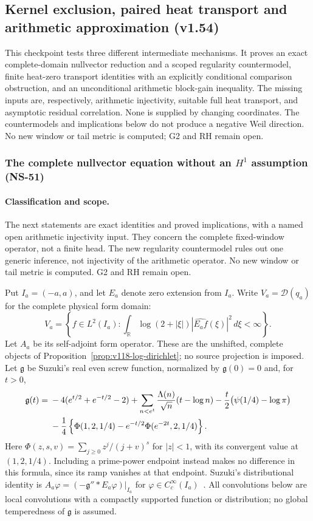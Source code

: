 \documentclass[11pt]{article}
\theoremstyle{remark}
\begin{document}
\subsection{Kernel exclusion, paired heat transport and arithmetic approximation (v1.54)}
\label{sec:v154-new-shapes}
This checkpoint tests three different intermediate mechanisms. It proves an
exact complete-domain nullvector reduction and a scoped regularity countermodel,
finite heat-zero transport identities with an explicitly conditional comparison
obstruction, and an unconditional arithmetic block-gain inequality. The missing
inputs are, respectively, arithmetic injectivity, suitable full heat transport,
and asymptotic residual correlation. None is supplied by changing coordinates.
The countermodels and implications below do not produce a negative Weil
direction. No new window or tail metric is computed; G2 and RH remain open.

\subsubsection{The complete nullvector equation without an \texorpdfstring{$H^1$}{H1} assumption (NS-51)}

\paragraph{Classification and scope.}
The next statements are exact identities and proved implications, with a
named open arithmetic injectivity input. They concern the complete
fixed-window operator, not a finite head. The new regularity countermodel
rules out one generic inference, not injectivity of the arithmetic
operator. No new window or tail metric is computed. G2 and RH remain open.

Put $I_a=(-a,a)$, and let $E_a$ denote zero extension from $I_a$.
Write $V_a=\mathcal D(q_a)$ for the complete physical form domain:
\[
 V_a=\left\{f\in L^2(I_a):
  \int_{\mathbb R}\log(2+|\xi|)|\widehat{E_af}(\xi)|^2\,d\xi<\infty\right\}.
\]
Let $A_a$ be its self-adjoint form operator. These are the unshifted,
complete objects of Proposition~\ref{prop:v118-log-dirichlet}; no source
projection is imposed. Let $\mathfrak g$ be Suzuki's real even screw
function, normalized by $\mathfrak g(0)=0$ and, for $t>0$,
\begin{align}
 \mathfrak g(t)={}&-4(e^{t/2}+e^{-t/2}-2)
  +\sum_{n<e^t}\frac{\Lambda(n)}{\sqrt n}(t-\log n)
  -\frac t2\bigl(\psi(1/4)-\log\pi\bigr)\notag\\
 &-\frac14\left\{\Phi(1,2,1/4)
             -e^{-t/2}\Phi(e^{-2t},2,1/4)\right\}.
 \label{eq:ns51-screw}
\end{align}
Here $\Phi(z,s,v)=\sum_{j\ge0}z^j/(j+v)^s$ for $|z|<1$,
with its convergent value at $(1,2,1/4)$. Including a prime-power
endpoint instead makes no difference in this formula, since its ramp
vanishes at that endpoint. Suzuki's distributional identity is
$A_a\varphi=(-\mathfrak g''*E_a\varphi)|_{I_a}$ for
$\varphi\in C_c^\infty(I_a)$~\cite[Sections 2.5 and 3]{Suzuki2026}.
All convolutions below are local convolutions with a compactly supported
function or distribution; no global temperedness of $\mathfrak g$ is
assumed.
\end{document}
